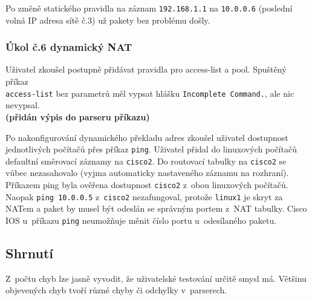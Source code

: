 Po změně statického pravidla na záznam \verb|192.168.1.1| na \verb|10.0.0.6| (poslední volná IP adresa sítě č.3) už pakety bez problému došly.

\subsubsection{Úkol č.6 dynamický NAT}
Uživatel zkoušel postupně přidávat pravidla pro access-list a pool. Spuštěný příkaz \\\verb|access-list| bez parametrů měl vypsat hlášku \verb|Incomplete Command.|, ale nic nevypsal.
\\\textbf{(přidán výpis do parseru příkazu)}

Po nakonfigurování dynamického překladu adres zkoušel uživatel dostupnost jednotlivých počítačů přes příkaz \verb|ping|. Uživatel přidal do linuxových počítačů defaultní směrovací záznamy na \verb|cisco2|. Do routovací tabulky na \verb|cisco2| se vůbec nezasahovalo (vyjma automaticky nastaveného záznamu na rozhraní). Příkazem ping byla ověřena dostupnost \verb|cisco2| z~obou linuxových počítačů. Naopak \verb|ping 10.0.0.5| z~\verb|cisco2| nezafungoval, protože \verb|linux1| je skryt za NATem a paket by musel být odeslán se správným portem z~NAT tabulky. Cisco IOS u~příkazu \verb|ping| neumožňuje měnit číslo portu u~odesílaného paketu.



\subsection{Shrnutí}
Z~počtu chyb lze jasně vyvodit, že uživatelské testování určitě smysl má. Většinu objevených chyb tvoří různé chyby či odchylky v~parserech.










